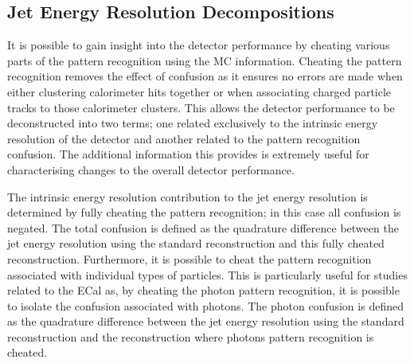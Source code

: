 
\subsection{Jet Energy Resolution Decompositions}
It is possible to gain insight into the detector performance by cheating various parts of the pattern recognition using the MC information.  Cheating the pattern recognition removes the effect of confusion as it ensures no errors are made when either clustering calorimeter hits together or when associating charged particle tracks to those calorimeter clusters.  This allows the detector performance to be deconstructed into two terms; one related exclusively to the intrinsic energy resolution of the detector and another related to the pattern recognition confusion.  The additional information this provides is extremely useful for characterising changes to the overall detector performance.  

The intrinsic energy resolution contribution to the jet energy resolution is determined by fully cheating the pattern recognition; in this case all confusion is negated.  The total confusion is defined as the quadrature difference between the jet energy resolution using the standard reconstruction and this fully cheated reconstruction.  Furthermore, it is possible to cheat the pattern recognition associated with individual types of particles.  This is particularly useful for studies related to the ECal as, by cheating the photon pattern recognition, it is possible to isolate the confusion associated with photons.  The photon confusion is defined as the quadrature difference between the jet energy resolution using the standard reconstruction and the reconstruction where photons pattern recognition is cheated.    


